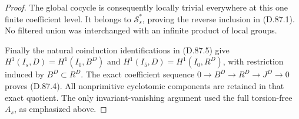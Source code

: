 \begin{proof}
The global cocycle is consequently locally trivial everywhere
at this one finite coefficient level. It belongs to
\(\mathcal S_s^*\), proving the reverse inclusion in (D.87.1).
No filtered union was interchanged with an infinite product
of local groups.

Finally the natural coinduction identifications in (D.87.5)
give \(H^1(I_s,D)=H^1(I_0,B^D)\) and
\(H^1(I_5,D)=H^1(I_0,R^D)\), with restriction induced by
\(B^D\subset R^D\). The exact coefficient sequence
\(0\to B^D\to R^D\to J^D\to0\) proves (D.87.4).
All nonprimitive cyclotomic components are retained in that
exact quotient. The only invariant-vanishing argument used
the full torsion-free \(A_s\), as emphasized above.
\end{proof}
